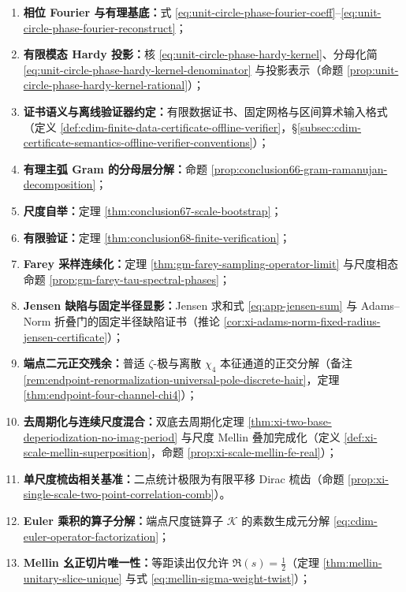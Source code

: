 \begin{enumerate}
  \item \textbf{相位 Fourier 与有理基底：}式 \eqref{eq:unit-circle-phase-fourier-coeff}--\eqref{eq:unit-circle-phase-fourier-reconstruct}；
  \item \textbf{有限模态 Hardy 投影：}核 \eqref{eq:unit-circle-phase-hardy-kernel}、分母化简 \eqref{eq:unit-circle-phase-hardy-kernel-denominator} 与投影表示（命题 \ref{prop:unit-circle-phase-hardy-kernel-rational}）；
  \item \textbf{证书语义与离线验证器约定：}有限数据证书、固定网格与区间算术输入格式（定义 \ref{def:cdim-finite-data-certificate-offline-verifier}，\S\ref{subsec:cdim-certificate-semantics-offline-verifier-conventions}）；
  \item \textbf{有理主弧 Gram 的分母层分解：}命题 \ref{prop:conclusion66-gram-ramanujan-decomposition}；
  \item \textbf{尺度自举：}定理 \ref{thm:conclusion67-scale-bootstrap}；
  \item \textbf{有限验证：}定理 \ref{thm:conclusion68-finite-verification}；
  \item \textbf{Farey 采样连续化：}定理 \ref{thm:gm-farey-sampling-operator-limit} 与尺度相态命题 \ref{prop:gm-farey-tau-spectral-phases}；
  \item \textbf{Jensen 缺陷与固定半径显影：}Jensen 求和式 \eqref{eq:app-jensen-sum} 与 Adams--Norm 折叠门的固定半径缺陷证书（推论 \ref{cor:xi-adams-norm-fixed-radius-jensen-certificate}）；
  \item \textbf{端点二元正交残余：}普适 \(\zeta\)-极与离散 \(\chi_4\) 本征通道的正交分解（备注 \ref{rem:endpoint-renormalization-universal-pole-discrete-hair}，定理 \ref{thm:endpoint-four-channel-chi4}）；
  \item \textbf{去周期化与连续尺度混合：}双底去周期化定理 \ref{thm:xi-two-base-deperiodization-no-imag-period} 与尺度 Mellin 叠加完成化（定义 \ref{def:xi-scale-mellin-superposition}，命题 \ref{prop:xi-scale-mellin-fe-real}）；
  \item \textbf{单尺度梳齿相关基准：}二点统计极限为有限平移 Dirac 梳齿（命题 \ref{prop:xi-single-scale-two-point-correlation-comb}）。
  \item \textbf{Euler 乘积的算子分解：}端点尺度链算子 \(\mathcal{K}\) 的素数生成元分解 \eqref{eq:cdim-euler-operator-factorization}；
  \item \textbf{Mellin 幺正切片唯一性：}等距读出仅允许 \(\Re(s)=\tfrac12\)（定理 \ref{thm:mellin-unitary-slice-unique} 与式 \eqref{eq:mellin-sigma-weight-twist}）；

\end{enumerate}
